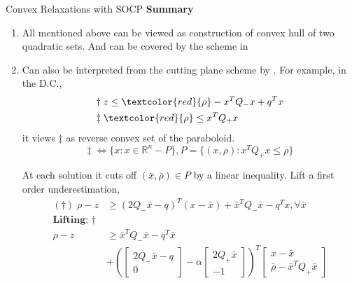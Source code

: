 \documentclass[aspectratio=1610, 10pt]{beamer}
\newcommand{\red}[1]{\textcolor{red}{#1}}
\begin{document}
\begin{frame}[allowframebreaks]{Convex Relaxations with SOCP}
  \framebreak
  \textbf{Summary}
  \begin{enumerate}
    \item All mentioned above can be viewed as construction of convex hull of two quadratic sets. And can be covered by the scheme in \cite{burer_how_2017}
    \item Can also be interpreted from the cutting plane scheme by \cite{bienstock_cutting-planes_2014}. For example, in the D.C.,
          \begin{align*}
            \dagger\;  & z \le \textcolor{red}{\rho} - x^TQ_-x + q^Tx \\
            \ddagger\; & \red{\rho} \le x^TQ_+x                       \\
          \end{align*}
          it views \(\ddagger\) as reverse convex set of the paraboloid.
          \begin{equation}
            \ddagger\; \Leftrightarrow \{x: x\in \mathbb R^n - P\}, P = \{(x, \rho) : x^TQ_+x \le \rho\}
          \end{equation}

          \framebreak

          At each solution it cuts off \((\bar x, \bar \rho) \in P\) by a linear inequality.
          Lift a first order underestimation,
          \begin{align*}
            (\dagger)\; \rho - z & \ge \left(2Q_-\bar x - q\right)^T(x-\bar x) + \bar x^TQ_-\bar x - q^Tx, \forall \bar x \\
            \textbf{Lifting: } \dagger                                                                                    \\
            \rho - z             & \ge \bar{x}^{T} Q_- \bar{x} - q^{T} \bar{x}
            \\
                                 & +\left(
            \begin{bmatrix} 2Q_-\bar x - q \\ 0 \end{bmatrix} - \alpha
            \begin{bmatrix} 2Q_+ \bar{x} \\ -1 \end{bmatrix}
            \right)^{T}\begin{bmatrix}
              x-\bar{x} \\
              \bar\rho-\bar{x}^{T} Q_+ \bar{x}
            \end{bmatrix}                                                                         \\
          \end{align*}


\end{enumerate}
\end{frame}
\end{document}
